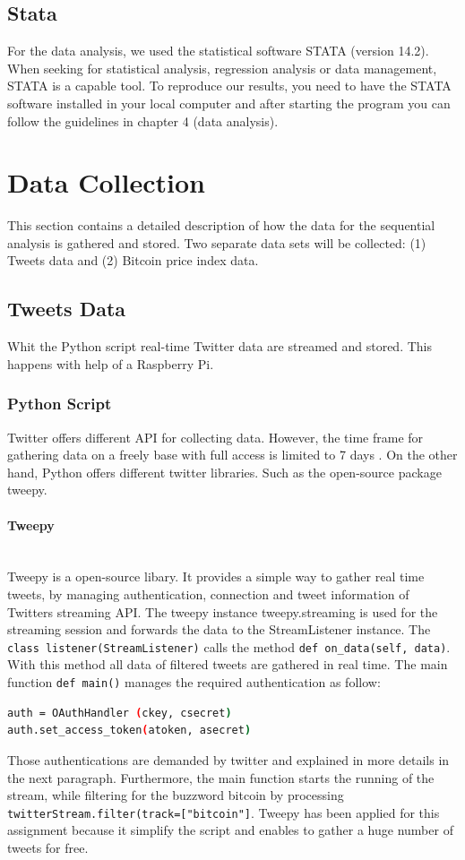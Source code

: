 \documentclass[a4paper,12pt]{article}
\begin{document}
\begin{spacing}{1.2}
\subsection{Stata}
For the data analysis, we used the statistical software STATA (version 14.2). When seeking for statistical analysis, regression analysis or data management, STATA is a capable tool. To reproduce our results, you need to have the STATA software installed in your local computer and after starting the program you can follow the guidelines in chapter 4 (data analysis). 

\clearpage

\section{Data Collection}
This section contains a detailed description of how the data for the sequential analysis is gathered and stored. Two separate data sets will be collected: (1) Tweets data and  (2) Bitcoin price index data.
\subsection{Tweets Data}
Whit the Python script real-time Twitter data are streamed and stored. This happens with help of a Raspberry Pi.
\subsubsection{Python Script}
Twitter offers different API for collecting data. However, the time frame for gathering data on a freely base with full access is limited to 7 days \parencite{twitterinc2017a}. On the other hand, Python offers different twitter libraries. Such as the open-source package tweepy.

\paragraph{Tweepy}\mbox{}\\{}
Tweepy is a open-source libary. It provides a simple way to gather real time tweets, by managing authentication, connection and tweet information of Twitters streaming API. The tweepy instance tweepy.streaming is used for the streaming session and forwards the data to the StreamListener instance. The \verb|class listener(StreamListener)| calls the method \verb|def on_data(self, data)|. With this method all data of filtered tweets are gathered in real time. \parencite{tweepy} The main function \verb|def main()| manages the required authentication as follow:
\begin{lstlisting}[language=bash]
auth = OAuthHandler (ckey, csecret)
auth.set_access_token(atoken, asecret)
\end{lstlisting}
Those authentications are demanded by twitter and explained in more details in the next paragraph. Furthermore, the main function starts the running of the stream, while filtering for the buzzword bitcoin by processing \verb|twitterStream.filter(track=["bitcoin"]|. Tweepy has been applied for this assignment because it simplify the script and enables to gather a huge number of tweets for free. 



\end{spacing}
\end{document}
